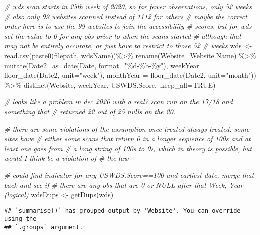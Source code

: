 \documentclass[
]{article}
\newenvironment{Shaded}{\begin{snugshade}}{\end{snugshade}}
\newcommand{\AttributeTok}[1]{\textcolor[rgb]{0.77,0.63,0.00}{#1}}
\newcommand{\CommentTok}[1]{\textcolor[rgb]{0.56,0.35,0.01}{\textit{#1}}}
\newcommand{\ConstantTok}[1]{\textcolor[rgb]{0.00,0.00,0.00}{#1}}
\newcommand{\FunctionTok}[1]{\textcolor[rgb]{0.00,0.00,0.00}{#1}}
\newcommand{\NormalTok}[1]{#1}
\newcommand{\OtherTok}[1]{\textcolor[rgb]{0.56,0.35,0.01}{#1}}
\newcommand{\SpecialCharTok}[1]{\textcolor[rgb]{0.00,0.00,0.00}{#1}}
\newcommand{\StringTok}[1]{\textcolor[rgb]{0.31,0.60,0.02}{#1}}
\begin{document}
\begin{Shaded}
\begin{Highlighting}[]
\CommentTok{\# wds scan starts in 25th week of 2020, so far fewer observations, only 52 weeks}
\CommentTok{\# also only 99 websites scanned instead of 1112 for others}
\CommentTok{\# maybe the correct order here is to use the 99 websites to join the accessibility }
\CommentTok{\# scores, but for wds set the value to 0 for any obs prior to when the scans started}
\CommentTok{\# although that may not be entirely accurate, or just have to restrict to those 52 }
\CommentTok{\# weeks}
\NormalTok{wds }\OtherTok{\textless{}{-}} \FunctionTok{read.csv}\NormalTok{(}\FunctionTok{paste0}\NormalTok{(filepath, wdsName))}\SpecialCharTok{\%\textgreater{}\%}
  \FunctionTok{rename}\NormalTok{(}\AttributeTok{Website=}\NormalTok{Website.Name) }\SpecialCharTok{\%\textgreater{}\%}
  \FunctionTok{mutate}\NormalTok{(}\AttributeTok{Date2=}\FunctionTok{as\_date}\NormalTok{(Date, }\AttributeTok{format=}\StringTok{"\%d{-}\%b{-}\%y"}\NormalTok{),}
    \AttributeTok{weekYear =} \FunctionTok{floor\_date}\NormalTok{(Date2, }\AttributeTok{unit=}\StringTok{"week"}\NormalTok{),}
    \AttributeTok{monthYear =} \FunctionTok{floor\_date}\NormalTok{(Date2, }\AttributeTok{unit=}\StringTok{"month"}\NormalTok{)) }\SpecialCharTok{\%\textgreater{}\%}
  \FunctionTok{distinct}\NormalTok{(Website, weekYear, USWDS.Score, }\AttributeTok{.keep\_all=}\ConstantTok{TRUE}\NormalTok{)}

\CommentTok{\# looks like a problem in dec 2020 with a real? scan run on the 17/18 and something that }
\CommentTok{\# returned 22 out of 25 nulls on the 20. }

\CommentTok{\# there are some violations of the assumption once treated always treated. some sites have}
\CommentTok{\# either some scans that return 0 in a longer sequence of 100s and at least one goes from}
\CommentTok{\# a long string of 100s to 0s, which in theory is possible, but would I think be a violation of}
\CommentTok{\# the law}

\CommentTok{\# could find indicator for any USWDS.Score==100 and earliest date, merge that back and see if}
\CommentTok{\# there are any obs that are 0 or NULL after that Week, Year (logical)}
\NormalTok{wdsDups }\OtherTok{\textless{}{-}} \FunctionTok{getDups}\NormalTok{(wds)}
\end{Highlighting}
\end{Shaded}

\begin{verbatim}
## `summarise()` has grouped output by 'Website'. You can override using the
## `.groups` argument.
\end{verbatim}
\end{document}
